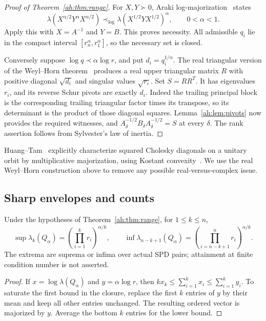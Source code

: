 \begin{proof}[Proof of Theorem~\ref{ah:thm:range}]
For $X,Y\succ0$, Araki log-majorization~\cite{Araki} states
\[
 \lambda(X^{\alpha/2}Y^\alpha X^{\alpha/2})
 \prec_{\log}
 \lambda(X^{1/2}YX^{1/2})^\alpha,
 \qquad0<\alpha<1.
\]
Apply this with $X=A^{-1}$ and $Y=B$. This proves necessity.
All admissible $q_i$ lie in the compact interval
$[r_n^\alpha,r_1^\alpha]$, so the necessary set is closed.

Conversely suppose $\log q\prec\alpha\log r$, and put
$d_i=q_i^{1/\alpha}$. The real triangular version of the
Weyl--Horn theorem~\cite{Horn,LiMathias} produces a real upper
triangular matrix $R$ with positive diagonal $\sqrt{d_i}$ and
singular values $\sqrt{r_i}$. Set $S=RR^T$.
It has eigenvalues $r_i$, and its reverse Schur pivots are exactly
$d_i$. Indeed the trailing principal block is the corresponding
trailing triangular factor times its transpose, so its determinant
is the product of those diagonal squares.
Lemma~\ref{ah:lem:pivots} now provides the required witnesses, and
$A_\delta^{-1/2}B_\delta A_\delta^{-1/2}=S$ at every $\delta$.
The rank assertion follows from Sylvester's law of inertia.
\end{proof}

Huang--Tam~\cite[Theorem 3.3]{HT} explicitly characterize squared
Cholesky diagonals on a unitary orbit by multiplicative majorization,
using Kostant convexity~\cite{Kostant}. We use the real Weyl--Horn
construction above to remove any possible real-versus-complex issue.

\subsection{Sharp envelopes and counts}
\begin{corollary}
\label{ah:cor:envelope}
Under the hypotheses of Theorem~\ref{ah:thm:range}, for $1\le k\le n$,
\[
 \sup\lambda_k(Q_\alpha)
 =\left(\prod_{i=1}^k r_i\right)^{\alpha/k},
 \qquad
 \inf\lambda_{n-k+1}(Q_\alpha)
 =\left(\prod_{i=n-k+1}^n r_i\right)^{\alpha/k}.
\]
The extrema are suprema or infima over actual SPD pairs; attainment
at finite condition number is not asserted.
\end{corollary}
\begin{proof}
If $x=\log\lambda(Q_\alpha)$ and $y=\alpha\log r$, then
$kx_k\le\sum_{i=1}^kx_i\le\sum_{i=1}^ky_i$.
To saturate the first bound in the closure, replace the first $k$
entries of $y$ by their mean and keep all other entries unchanged.
The resulting ordered vector is majorized by $y$.
Average the bottom $k$ entries for the lower bound.
\end{proof}

